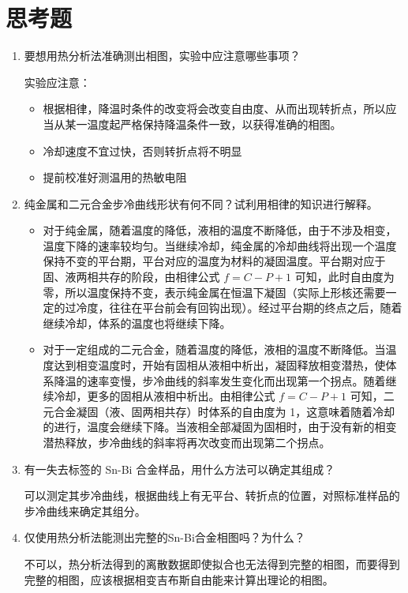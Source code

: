 \documentclass[a4paper,utf8]{article}
\begin{document}
\section{思考题}
    \begin{enumerate}
        \item 要想用热分析法准确测出相图，实验中应注意哪些事项？\par
        实验应注意：
        \begin{itemize}
            \item 根据相律，降温时条件的改变将会改变自由度、从而出现转折点，所以应当从某一温度起严格保持降温条件一致，以获得准确的相图。
            \item 冷却速度不宜过快，否则转折点将不明显
            \item 提前校准好测温用的热敏电阻
        \end{itemize}
        \item 纯金属和二元合金步冷曲线形状有何不同？试利用相律的知识进行解释。\par
        \begin{itemize}
            \item 对于纯金属，随着温度的降低，液相的温度不断降低，由于不涉及相变，温度下降的速率较均匀。当继续冷却，纯金属的冷却曲线将出现一个温度保持不变的平台期，平台对应的温度为材料的凝固温度。平台期对应于固、液两相共存的阶段，由相律公式 $f=C-P+1$ 可知，此时自由度为零，所以温度保持不变，表示纯金属在恒温下凝固（实际上形核还需要一定的过冷度，往往在平台前会有回钩出现）。经过平台期的终点之后，随着继续冷却，体系的温度也将继续下降。
            \item 对于一定组成的二元合金，随着温度的降低，液相的温度不断降低。当温度达到相变温度时，开始有固相从液相中析出，凝固释放相变潜热，使体系降温的速率变慢，步冷曲线的斜率发生变化而出现第一个拐点。随着继续冷却，更多的固相从液相中析出。由相律公式 $f=C-P+1$ 可知，二元合金凝固（液、固两相共存）时体系的自由度为 1，这意味着随着冷却的进行，温度会继续下降。当液相全部凝固为固相时，由于没有新的相变潜热释放，步冷曲线的斜率将再次改变而出现第二个拐点。
        \end{itemize}
        \item 有一失去标签的 Sn-Bi 合金样品，用什么方法可以确定其组成？\par
        可以测定其步冷曲线，根据曲线上有无平台、转折点的位置，对照标准样品的步冷曲线来确定其组分。
        \item 仅使用热分析法能测出完整的Sn-Bi合金相图吗？为什么？\par
        不可以，热分析法得到的离散数据即使拟合也无法得到完整的相图，而要得到完整的相图，应该根据相变吉布斯自由能来计算出理论的相图。
    \end{enumerate}
\end{document}
